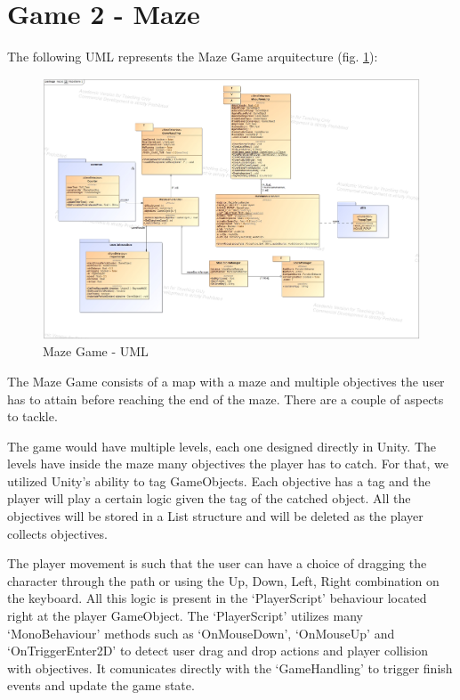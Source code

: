 \newpage
\section{Game 2 - Maze}

The following UML represents the Maze Game arquitecture (fig. \ref*{fig:mazeGameArq}):

\begin{figure}[!h]
    \centering
    \includegraphics[width=\linewidth]{Chapters/new_architechture/class__maze__MazeGame.jpg}
    \caption{Maze Game - UML}
    \label{fig:mazeGameArq}
\end{figure}

The Maze Game consists of a map with a maze and multiple objectives the user has to attain before reaching the end of the maze. There are a couple of aspects to tackle.

The game would have multiple levels, each one designed directly in Unity. The levels have inside the maze many objectives the player has to catch. For that, we utilized Unity's ability to tag GameObjects. Each objective has a tag and the player will play a certain logic given the tag of the catched object. All the objectives will be stored in a List structure and will be deleted as the player collects objectives.

The player movement is such that the user can have a choice of dragging the character through the path or using the Up, Down, Left, Right combination on the keyboard. All this logic is present in the `PlayerScript' behaviour located right at the player GameObject. The `PlayerScript' utilizes many `MonoBehaviour' methods such as `OnMouseDown', `OnMouseUp' and `OnTriggerEnter2D' to detect user drag and drop actions and player collision with objectives. It comunicates directly with the `GameHandling' to trigger finish events and update the game state.

